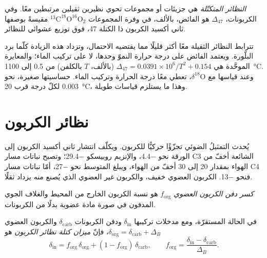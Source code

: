 \begin{definition}\label{def:b3:stable-isotopes:clumped}
\emph{النظائر المتكتّلة} هي جزيئات أو مجموعات تحوي
نظيرين ثقيلين مرتبطين معًا. وفي الكربونات، $\Delta_{47}$ هو
الفائض، بالألف، في وفرة المجموعات $^{13}\mathrm C^{18}\mathrm O^{16}\mathrm O_2$
مقيسةً بوصفها ثاني أكسيد الكربون ذا الكتلة 47، فوق توزيع عشوائي
للنظائر.
\end{definition}

تترابط النظائر الثقيلة معًا أكثر قليلًا مما يقتضيه الاحتمال،
وتزداد هذه الزيادة كلّما برد البلّورة. ويعتمد الفائض على
درجة حرارة النموّ وحدها، لا على تركيب الماء؛ والمعايرة الموحَّدة
هي $\Delta_{47} = 0.0391\times10^6/T^2 + 0.154$ (بالألف، $T$
بالكلفن) من 0.5 إلى \qty{1100}{\celsius}. وعند قياسها مع
$\delta^{18}\mathrm O$، تعطي معًا درجة الحرارة وتركيب
الماء. حساسيتها صغيرة، نحو \qty{0.003}{\permil} لكلّ درجة قرب
\qty{20}{\celsius}، وهذا ما يستلزم قياسات طويلة.

\section{نظائر الكربون}\label{sec:b3:stable-isotopes:carbon}

يُحدث التمثيلُ الضوئي تجزّؤًا حركيًّا للكربون. ويكلّف انتشار ثاني أكسيد الكربون
إلى الورقة نحو \qty{-4.4}{\permil}، والإنزيم روبيسكو
\qty{-29.4}{\permil}؛ وتصبح نباتات مسار C3 الشائعة أخفّ من الهواء بمقدار \num{20} إلى
\qty{30}{\permil} أخفّ من الهواء، ويبلغ المتوسط نحو
\qty{-27}{\permil}، أمّا نباتات مسار C4 فنحو \qty{-13}{\permil}. الكربون العضوي
خفيف، والكربون غير العضوي الذي يُصنع منه يزداد ثقلًا.

\begin{definition}\label{def:b3:stable-isotopes:forg}
\emph{كسر دفن الكربون العضوي}
$f_{\mathrm{org}}$ هو نسبة الكربون الخارج من المحيط والغلاف الجوي
المدفون في صورة مادة عضوية بدلًا من الكربونات.
\end{definition}

\begin{proposition}\label{prop:b3:stable-isotopes:forg}
في الحالة المستقرّة، ومع مدخلات تركيبها $\delta_{\mathrm{in}}$ ودفن
الكربونات $\delta_{\mathrm{carb}}$ والكربون العضوي $\delta_{\mathrm{org}} =
\delta_{\mathrm{carb}} + \Delta_B$، فإنّ \emph{ميزان كتلة
نظائر الكربون} هو
\[
\delta_{\mathrm{in}} = f_{\mathrm{org}}\,\delta_{\mathrm{org}} + (1 - f_{\mathrm{org}})\,
\delta_{\mathrm{carb}}, \qquad f_{\mathrm{org}} = \frac{\delta_{\mathrm{in}} -
\delta_{\mathrm{carb}}}{\Delta_B}.
\]
\end{proposition}

